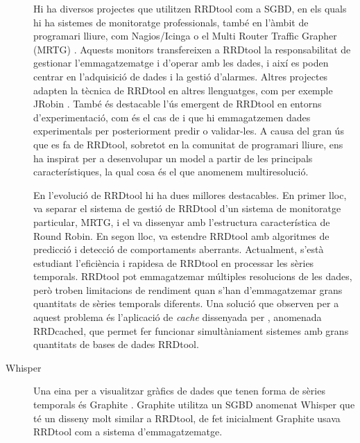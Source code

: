 \begin{description}
  Hi ha diversos projectes que utilitzen RRDtool com a \gls{SGBD}, en
  els quals hi ha sistemes de monitoratge professionals, també en
  l'àmbit de programari lliure, com
  Nagios/Icinga \parencite{nagios,icinga} o el Multi Router Traffic
  Grapher (MRTG) \parencite{mrtg}. Aquests monitors transfereixen a
  RRDtool la responsabilitat de gestionar l'emmagatzematge i d'operar
  amb les dades, i així es poden centrar en l'adquisició de dades i la
  gestió d'alarmes. Altres projectes adapten la tècnica de RRDtool en
  altres llenguatges, com per exemple
  JRobin \parencite{jrobin}. També és destacable l'ús emergent
  de RRDtool en entorns d'experimentació, com és el cas de
  \textcite{zhang07} i \textcite{chilingaryan10} que hi emmagatzemen
  dades experimentals per posteriorment predir o validar-les.  A causa
  del gran ús que es fa de RRDtool, sobretot en la comunitat de
  programari lliure, ens ha inspirat per a desenvolupar un model a
  partir de les principals característiques, la qual cosa és el que
  anomenem multiresolució.


  En l'evolució de RRDtool hi ha dues millores destacables. En primer
  lloc, \textcite{lisa98:oetiker} va separar el sistema de gestió de
  RRDtool d'un sistema de monitoratge particular, MRTG, i el va
  dissenyar amb l'estructura característica de Round Robin. En segon
  lloc, \textcite{lisa00:brutlag} va estendre RRDtool amb algoritmes
  de predicció i detecció de comportaments aberrants.  Actualment,
  s'està estudiant l'eficiència i rapidesa de RRDtool en processar les
  sèries temporals.  RRDtool pot emmagatzemar múltiples resolucions de
  les dades, però \textcite{lisa07:plonka} troben limitacions de
  rendiment quan s'han d'emmagatzemar grans quantitats de sèries
  temporals diferents. Una solució que observen per a aquest problema
  és l'aplicació de \emph{cache} dissenyada per
  \textcite{carder:rrdcached}, anomenada RRDcached, que permet
  fer funcionar simultàniament sistemes amb grans quantitats de bases
  de dades RRDtool.




\item[Whisper] Una eina per a visualitzar gràfics de dades que tenen
  forma de sèries temporals és Graphite \parencite{graphite}. Graphite
  utilitza un \gls{SGBD} anomenat Whisper que té un disseny molt
  similar a RRDtool, de fet inicialment Graphite usava RRDtool com a
  sistema d'emmagatzematge.






\end{description}
